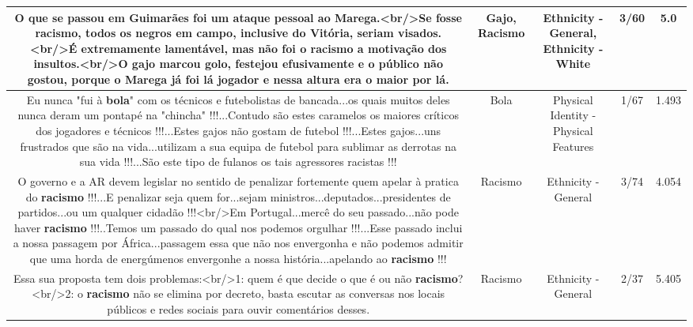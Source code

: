 \documentclass[11pt]{article}
\newlength\mylength
\begin{document}
\begin{center}
\begin{longtable}{|C{.65\mylength}|C{.30\mylength}|C{.12\mylength}|C{.12\mylength}|C{.12\mylength}|}
  \small O que se passou em Guimarães foi um ataque pessoal ao Marega.<br/>Se fosse \textbf{racismo}, todos os negros em campo, inclusive do Vitória, seriam visados.<br/>É extremamente lamentável, mas não foi o \textbf{racismo} a motivação dos insultos.<br/>O \textbf{gajo} marcou golo, festejou efusivamente e o público não gostou, porque o Marega já foi lá jogador e nessa altura era o maior por lá.\normalsize   & Gajo, Racismo & Ethnicity - General, Ethnicity - White & 3/60 & 5.0 \\  \hline
  \small Eu nunca "fui à \textbf{bola}" com os técnicos e futebolistas de bancada...os quais muitos deles nunca deram um pontapé na "chincha" !!!...Contudo são estes caramelos os maiores críticos dos jogadores e técnicos !!!...Estes gajos não gostam de futebol !!!...Estes gajos...uns frustrados que são na vida...utilizam a sua equipa de futebol para sublimar as derrotas na sua vida !!!...São este tipo de fulanos os tais agressores racistas !!!\normalsize   & Bola & Physical Identity - Physical Features & 1/67 & 1.493 \\  \hline
  \small O governo e a AR devem legislar no sentido de penalizar fortemente quem apelar à pratica do \textbf{racismo} !!!...E penalizar seja quem for...sejam ministros...deputados...presidentes de partidos...ou um qualquer cidadão !!!<br/>Em Portugal...mercê do seu passado...não pode haver \textbf{racismo} !!!..Temos um passado do qual nos podemos orgulhar !!!...Esse passado inclui a nossa passagem por África...passagem essa que não nos envergonha e não podemos admitir que uma horda de energúmenos envergonhe a nossa história...apelando ao \textbf{racismo} !!!\normalsize   & Racismo & Ethnicity - General & 3/74 & 4.054 \\  \hline
  \small Essa sua proposta tem dois problemas:<br/>1: quem é que decide o que é ou não \textbf{racismo}?<br/>2: o \textbf{racismo} não se elimina por decreto, basta escutar as conversas nos locais públicos e redes sociais para ouvir comentários desses.\normalsize   & Racismo & Ethnicity - General & 2/37 & 5.405 \\  \hline

\end{longtable}
\end{center}
\end{document}

